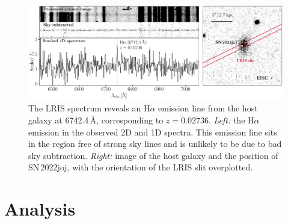 \documentclass[twocolumn]{aastex631}
\newcommand{\sn}{SN\,2022joj}
\begin{document}
\begin{CJK*}{UTF8}{gbsn}
\begin{figure}
    \label{fig:spec_seq}
\end{figure}
\begin{figure}
    \centering
    \includegraphics[width=\linewidth]{host_spec.pdf}
    \caption{The LRIS spectrum reveals an H$\alpha$ emission line from the host galaxy at 6742.4\,\AA, corresponding to $z=0.02736$. \textit{Left:} the H$\alpha$ emission in the observed 2D and 1D spectra. This emission line sits in the region free of strong sky lines and is unlikely to be due to bad sky subtraction.
    \textit{Right:} image of the host galaxy and the position of \sn, with the orientation of the LRIS slit overplotted. 
    }
    \label{fig:host_spec}
\end{figure}


\section{Analysis} \label{sec:analysis}

\end{CJK*}
\end{document}
